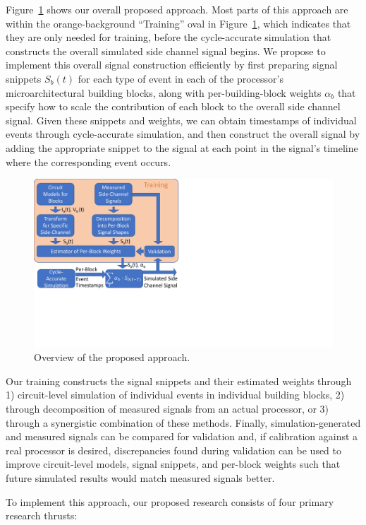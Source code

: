 Figure~\ref{fig:overview} shows our overall proposed approach. Most parts of this approach are within the orange-background ``Training'' oval in Figure~\ref{fig:overview}, which indicates that they are only needed for training, before the cycle-accurate simulation that constructs the overall simulated side channel signal begins. 
We propose to implement this overall signal construction efficiently by first preparing signal snippets $S_b(t)$ for each type of event in each of the processor's microarchitectural building blocks, along with per-building-block weights ${\alpha}_b$ that specify how to scale the contribution of each block to the overall side channel signal.
Given these snippets and weights, we can obtain timestamps of individual events through cycle-accurate simulation, and then construct the overall signal by adding the appropriate snippet to the signal at each point in the signal's timeline where the corresponding event occurs.

\begin{figure}
	\centering
	\includegraphics[width=0.45\columnwidth,trim={0in 2.65in 6.89in 0in},clip]{figure/overview.pdf}
	\vspace{-0.3in}
	\caption{Overview of the proposed approach.}
	\label{fig:overview}
\end{figure}
Our training constructs the signal snippets and their estimated weights through 1) circuit-level simulation of individual events in individual building blocks, 2) through decomposition of measured signals from an actual processor, or 3) through a synergistic combination of these methods. Finally, simulation-generated and measured signals can be compared for validation and, if calibration against a real processor is desired, discrepancies found during validation can be used to improve circuit-level models, signal snippets, and per-block weights such that future simulated results would match measured signals better.

To implement this approach, our proposed research consists of four primary research thrusts:

